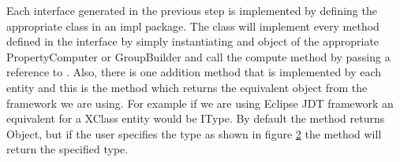 \begin{figure}
\centering
{}
\label{fig:xCorexRunExample}
\end{figure}
	
	Each interface generated in the previous step is implemented by defining the
appropriate class in an impl package. The class will implement every method
defined in the interface by simply instantiating and object of the appropriate
PropertyComputer or GroupBuilder and call the compute method by passing a
reference to . Also, there is one addition method that is implemented 
by each entity and this is the  method which returns
the equivalent object from the framework we are using. For example if we are
using Eclipse JDT framework an equivalent for a XClass entity would be IType.
By default the method returns Object, but if the user specifies the type as
shown in figure \ref{fig:xCorexTypeDialogBox} the method will return the
specified type.

\begin{figure}
\centering
{}
\label{fig:xCorexTypeDialogBox}
\end{figure}

